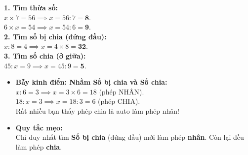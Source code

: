 \documentclass[12pt,a4paper]{article}
\begin{document}
\vspace{-2.5mm}
\noindent
\begin{minipage}[t]{0.49\textwidth}\vspace{0pt}
\begin{tcolorbox}[
  enhanced,
  colback=green!4!white,
  colframe=green!60!black,
  arc=2mm, boxrule=0.8pt,
  left=2mm, right=2mm, top=1.8mm, bottom=1.8mm,
  title={\footnotesize\bfseries\color{white}\faCheckCircle\ Ví dụ thực hành chuẩn mực}
]
{\footnotesize
\textbf{1. Tìm thừa số:}\\
$x \times 7 = 56 \implies x = 56 : 7 = \mathbf{8}$.\\
$6 \times x = 54 \implies x = 54 : 6 = \mathbf{9}$.\\
\textbf{2. Tìm số bị chia (đứng đầu):}\\
$x : 8 = 4 \implies x = 4 \times 8 = \mathbf{32}$.\\
\textbf{3. Tìm số chia (ở giữa):}\\
$45 : x = 9 \implies x = 45 : 9 = \mathbf{5}$.
}
\end{tcolorbox}
\end{minipage}
\hfill
\begin{minipage}[t]{0.49\textwidth}\vspace{0pt}
\begin{tcolorbox}[
  enhanced,
  colback=red!4!white,
  colframe=red!70!black,
  arc=2mm, boxrule=0.8pt,
  left=2mm, right=2mm, top=1.8mm, bottom=1.8mm,
  title={\footnotesize\bfseries\color{white}\faExclamationTriangle\ Mẹo tránh bẫy trắc nghiệm}
]
{\footnotesize
\begin{itemize}\setlength{\itemsep}{1.5pt}\setlength{\leftskip}{-2.5mm}
  \item \textbf{Bẫy kinh điển: Nhầm Số bị chia và Số chia:}\\
  $x : 6 = 3 \implies x = 3 \times 6 = 18$ (phép NHÂN).\\
  $18 : x = 3 \implies x = 18 : 3 = 6$ (phép CHIA).\\
  Rất nhiều bạn thấy phép chia là auto làm phép nhân!
  \item \textbf{Quy tắc mẹo:}\\
  Chỉ duy nhất tìm \textbf{Số bị chia} (đứng đầu) mới làm phép \textbf{nhân}. Còn lại đều làm phép \textbf{chia}.
\end{itemize}
}
\end{tcolorbox}
\end{minipage}
\end{document}
